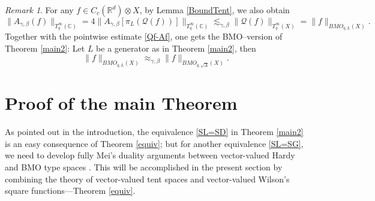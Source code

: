 \documentclass[oneside,english,a4wide]{amsart}
\numberwithin{equation}{section}
\numberwithin{figure}{section}
\theoremstyle{plain}
\theoremstyle{plain}
\theoremstyle{definition}
\theoremstyle{plain}
\theoremstyle{remark}
\theoremstyle{definition}
\theoremstyle{remark}
\newtheorem{remark}[thm]{Remark}
\theoremstyle{definition}
\newcommand{\real}{{\mathbb R}}
\newcommand{\com}{{\mathbb C}}
\newcommand{\Q}{{\mathcal Q}}
\newcommand{\ot}{\otimes}
\newcommand{\8}{+\infty}
\renewcommand{\1}{\mathbbm{1}}
\newcommand\mk[1]{ \left[ #1 \right] }
\begin{document}
{{
\begin{remark}\label{equiv-BMO}
    For any $f \in C_c(\real^d) \ot X$, by Lemma \ref{BoundTent}, we also obtain
    \[
        \| A_{\gamma, \beta}(f) \|_{T^\infty_q(\com)} = 4\| A_{\gamma, \beta}\mk{ \pi_L(\Q(f)) }  \|_{T^\infty_q(\com)} \lesssim_{\gamma, \beta} \| \Q(f) \|_{T^\infty_q(X)} = \| f \|_{BMO_{q, L}(X)}.      
    \]
    Together with the pointwise estimate \eqref{Qf-Af}, one gets the BMO--version of Theorem \ref{main2}: Let $L$ be a generator as in Theorem \ref{main2}, then
    \begin{equation}
        \| f \|_{BMO_{q, L}(X)} \approx_{\gamma, \beta} \| f \|_{BMO_{q, \sqrt{\Delta}}(X)}.
    \end{equation}
\end{remark}
}


\section{Proof of the main Theorem}\label{Proof}
As pointed out in the introduction, the equivalence \eqref{SL=SD} in Theorem \ref{main2} is an easy consequence of Theorem \ref{equiv}; but for another equivalence  \eqref{SL=SG}, we need to develop fully Mei's duality arguments between vector-valued Hardy and BMO type spaces \cite{Mei2007}. This will be accomplished in the present section by combining the theory of vector-valued tent spaces and vector-valued Wilson's square functions---Theorem \ref{equiv}.

}
\end{document}
